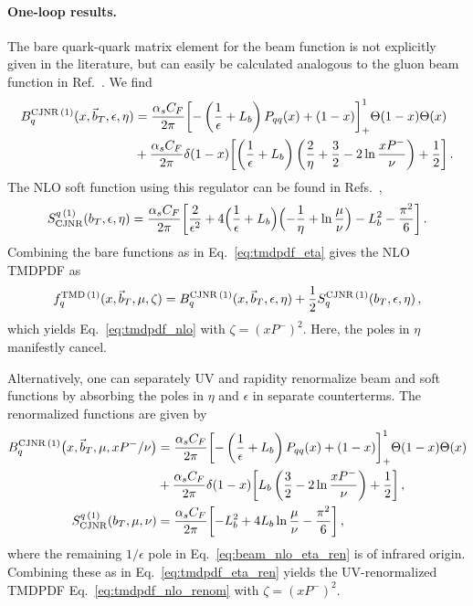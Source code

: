 \documentclass[11pt,a4paper]{article}
\DeclareRobustCommand{\eq}[1]{Eq.~\eqref{eq:#1}}
\DeclareRobustCommand{\mycite}[1]{Ref.~\cite{#1}}
\DeclareRobustCommand{\mycites}[1]{Refs.~\cite{#1}}
\newcommand{\eps}{\epsilon}
\newcommand{\nn}{\nonumber}
\newcommand{\as}{\alpha_s}
\newcommand\TMD{\mathrm{TMD}}
\newcommand{\bt}{\vec b_T}
\begin{document}
\paragraph{One-loop results.}
The bare quark-quark matrix element for the beam function is not explicitly given in the literature, but can easily be calculated analogous to the gluon beam function in \mycite{Chiu:2012ir}. We find
\begin{align} \label{eq:beam_nlo_eta}
 B_{q}^{{\rm CJNR}\,(1)}(x, \bt, \eps,\eta)
 &= \frac{\as C_F}{2\pi} \biggl[ - \left(\frac{1}{\eps} + L_b\right) P_{qq}(x) + (1-x) \biggr]_+^1\Theta(1-x)\Theta(x)
 \nn\\*&
  + \frac{\as C_F}{2\pi} \delta(1-x) \biggl[ \left(\frac{1}{\eps} + L_b\right)
   \left( \frac{2}{\eta} + \frac{3}{2} - 2 \ln\frac{x P^-}{\nu}\right) + \frac{1}{2} \biggr]
\,.\end{align}
The NLO soft function using this regulator can be found in \mycites{Chiu:2012ir,Luebbert:2016itl},
\begin{align} \label{eq:soft_nlo_eta}
 S^{q\,(1)}_{\rm CJNR}(b_T,\epsilon,\eta) = \frac{\as C_F}{2 \pi} \biggl[
    \frac{2}{\eps^2} + 4 \Bigl(\frac{1}{\eps} + L_b\Bigr)\Bigl( - \frac{1}{\eta} + \ln\frac{\mu}{\nu}\Bigr)
    - L_b^2 - \frac{\pi^2}{6} \biggr]
\,.\end{align}
Combining the bare functions as in \eq{tmdpdf_eta} gives the NLO TMDPDF as
\begin{align}
 f^{\TMD\,(1)}_q(x,\bt,\mu,\zeta) = B_{q}^{{\rm CJNR}\,(1)}(x,\bt,\eps,\eta) + \frac{1}{2} S_q^{{\rm CJNR}\,(1)}(b_T,\eps,\eta)
\,,\end{align}
which yields \eq{tmdpdf_nlo} with $\zeta = (x P^-)^2$.
Here, the poles in $\eta$ manifestly cancel.

Alternatively, one can separately UV and rapidity renormalize beam and soft functions by absorbing the poles in $\eta$ and $\eps$ in separate counterterms.
The renormalized functions are given by
\begin{align} \label{eq:beam_nlo_eta_ren}
 B_{q}^{{\rm CJNR}\,(1)}\bigl(x, \bt, \mu, x P^-/\nu\bigr)
 &= \frac{\as C_F}{2\pi} \biggl[ - \left(\frac{1}{\eps} + L_b\right) P_{qq}(x) + (1-x) \biggr]_+^1\Theta(1-x)\Theta(x)
 \nn\\*&
  + \frac{\as C_F}{2\pi} \delta(1-x) \biggl[ L_b \left(\frac{3}{2} - 2 \ln\frac{x P^-}{\nu}\right) + \frac{1}{2} \biggr]
\,,\\
 \label{eq:soft_nlo_eta_ren}
 S^{q\,(1)}_{\rm CJNR}(b_T,\mu,\nu) &= \frac{\as C_F}{2 \pi} \biggl[- L_b^2  + 4  L_b \ln\frac{\mu}{\nu}  - \frac{\pi^2}{6} \biggr]
\,,\end{align}
where the remaining $1/\epsilon$ pole in \eq{beam_nlo_eta_ren} is of infrared origin.
Combining these as in \eq{tmdpdf_eta_ren} yields the UV-renormalized TMDPDF \eq{tmdpdf_nlo_renom} with $\zeta = (x P^-)^2$.
\end{document}
